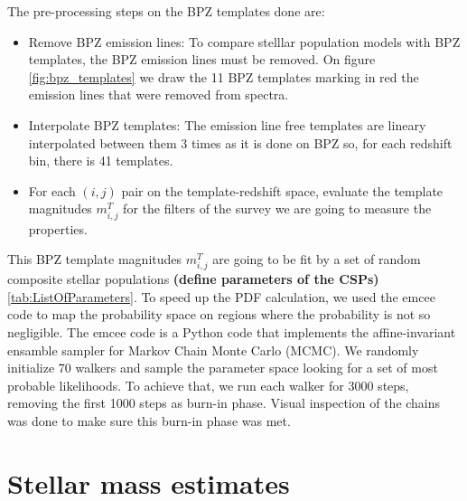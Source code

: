 \documentclass[9pt]{memoir}
\begin{document}
The pre-processing steps on the BPZ templates done are:

\begin{itemize}
\item Remove BPZ emission lines: To compare stelllar population models with BPZ templates, the BPZ emission lines must be removed. On figure \ref{fig:bpz_templates} we draw the 11 BPZ templates marking in red the emission lines that were removed from spectra.

\item Interpolate BPZ templates: The emission line free templates are lineary interpolated between them 3 times as it is done on BPZ so, for each redshift bin, there is 41 templates.

\item For each $(i, j)$ pair on the template-redshift space, evaluate the template magnitudes $m^T_{i,j}$ for the filters of the survey we are going to measure the properties.

\end{itemize}

This BPZ template magnitudes $m^T_{i,j}$ are going to be fit by a set of random composite stellar populations \textbf{(define parameters of the CSPs)} \ref{tab:ListOfParameters}. To speed up the PDF calculation, we used the emcee code \citep{ForemanMackey.etal.2013a} to map the probability space on regions where the probability is not so negligible. The emcee code is a Python code that implements the affine-invariant ensamble sampler for Markov Chain Monte Carlo (MCMC). We randomly initialize 70 walkers and sample the parameter space looking for a set of most probable likelihoods. To achieve that, we run each walker for 3000 steps, removing the first 1000 steps as burn-in phase. Visual inspection of the chains was done to make sure this burn-in phase was met.






\section{Stellar mass estimates}
\end{document}
